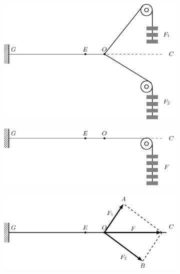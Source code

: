 \begin{figure} [htp]
\centering
\begin{subfigure} {1\linewidth} 
	\centering
	\includegraphics{fig/A/1-22a.pdf} 
	\caption{} \label{fig_A_1-22a} 
\end{subfigure} 
\begin{subfigure} {1\linewidth} 
	\centering
	\includegraphics{fig/A/1-22b.pdf} 
	\caption{} \label{fig_A_1-22b} 
\end{subfigure} 
\begin{subfigure} {1\linewidth} 
	\centering
	\includegraphics{fig/A/1-22c.pdf} 
	\caption{} \label{fig_A_1-22c} 
\end{subfigure} 
\caption{} \label{fig_A_1-22} 
\end{figure} 


